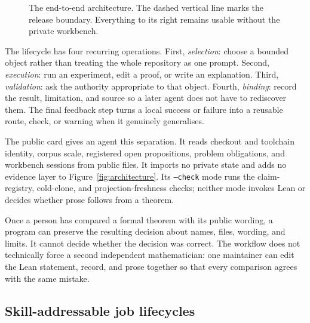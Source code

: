 \documentclass[10pt]{article}
\begin{document}
\begin{figure}[!t]
\caption{The end-to-end architecture. The dashed vertical line marks the
release boundary. Everything to its right remains usable without the private
workbench.}
\label{fig:lifecycle}
\end{figure}

The lifecycle has four recurring operations. First, \emph{selection}: choose a
bounded object rather than treating the whole repository as one prompt.
Second, \emph{execution}: run an experiment, edit a proof, or write an
explanation. Third, \emph{validation}: ask the authority appropriate to that
object. Fourth, \emph{binding}: record the result, limitation, and source so a
later agent does not have to rediscover them. The final feedback step turns a
local success or failure into a reusable route, check, or warning when it
genuinely generalises.

The public  card gives an agent this separation.
It reads checkout and toolchain
identity, corpus scale, registered open propositions, problem obligations, and
workbench sessions from public files.  It imports no private state and adds no
evidence layer to Figure~\ref{fig:architecture}.  Its \texttt{--check} mode
runs the claim-registry, cold-clone, and projection-freshness checks; neither
mode invokes Lean or decides whether prose follows from a theorem.

Once a person has compared a formal theorem with its public wording, a program
can preserve the resulting decision about names, files, wording, and limits.
It cannot decide whether the decision was correct.  The workflow does not
technically force a second independent mathematician: one maintainer can edit
the Lean statement, record, and prose together so that every comparison agrees
with the same mistake.
\subsection{Skill-addressable job lifecycles}
\end{document}
